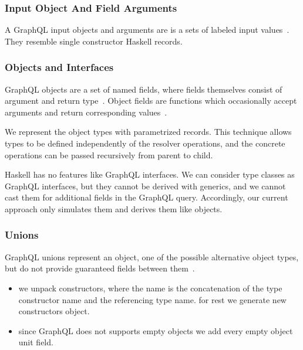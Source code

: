 \begin{frame}\frametitle{Input Object And Field Arguments}

A GraphQL input objects and arguments are is a sets of labeled input values~\cite{gql-spec}. They resemble single constructor Haskell records. 


\end{frame}
\begin{frame}[allowframebreaks]\frametitle{Objects and Interfaces}

GraphQL objects are a set of named fields, where fields themselves consist of argument and return type~\cite{gql-spec}. Object fields are functions which occasionally accept arguments and return corresponding values~\cite{gql-spec}.

We represent the object types with parametrized records. This technique allows types to be defined independently of the resolver operations, and the concrete operations can be passed recursively from parent to child. 

Haskell has no features like GraphQL interfaces. We can consider type classes as GraphQL interfaces, but they cannot be derived with generics, and we cannot cast them for additional fields in the GraphQL query. Accordingly, our current approach only simulates them and derives them like objects.



\end{frame}

\begin{frame}[allowframebreaks]\frametitle{Unions}

GraphQL unions represent an object, one of the possible alternative object types, but do not provide guaranteed fields between them~\cite{gql-spec}. 


\begin{itemize}
  \item we unpack constructors, where the name is the concatenation of the type constructor name and the referencing type name. for rest we generate new constructors object.
  \item since GraphQL does not supports empty objects we add every empty object unit field.
\end{itemize}


\end{frame}

